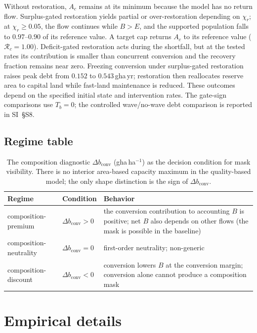 \documentclass[11pt,a4paper]{article}
\newcommand{\dconv}{\Delta b_{\mathrm{conv}}}
\begin{document}
Without restoration, $A_c$ remains at its minimum because the model has no return flow. Surplus-gated restoration yields partial or over-restoration depending on $\chi_r$; at $\chi_r\ge0.05$, the flow continues while $B>E$, and the supported population falls to $0.97$--$0.90$ of its reference value. A target cap returns $A_c$ to its reference value ($\mathcal R_c=1.00$). Deficit-gated restoration acts during the shortfall, but at the tested rates its contribution is smaller than concurrent conversion and the recovery fraction remains near zero. Freezing conversion under surplus-gated restoration raises peak debt from $0.152$ to $0.543$\,gha\,yr; restoration then reallocates reserve area to capital land while fast-land maintenance is reduced. These outcomes depend on the specified initial state and intervention rates. The gate-sign comparisons use $T_b=0$; the controlled wave/no-wave debt comparison is reported in SI~\S S8.\par\pagebreak

\subsection{Regime table}\label{si:regimes}

\begin{table}[H]
\centering\small
\caption{The composition diagnostic $\dconv$ (gha\,ha$^{-1}$) as the decision condition for mask visibility. There is no interior area-based capacity maximum in the quality-based model; the only shape distinction is the sign of $\dconv$.}
\label{tab:si_regime}
\begin{tabularx}{\textwidth}{l l X}
\toprule
Regime & Condition & Behavior \\
\midrule
composition-premium & $\dconv>0$ & the conversion contribution to accounting $B$ is positive; net $B$ also depends on other flows (the mask is possible in the baseline) \\
composition-neutrality & $\dconv=0$ & first-order neutrality; non-generic \\
composition-discount & $\dconv<0$ & conversion lowers $B$ at the conversion margin; conversion alone cannot produce a composition mask \\
\bottomrule
\end{tabularx}
\end{table}

\section{Empirical details}\label{si:empirical}
\end{document}
